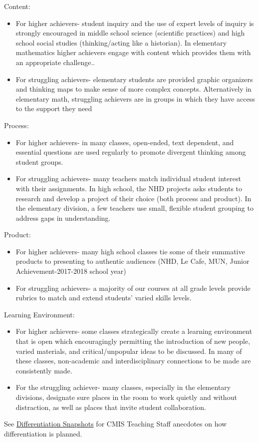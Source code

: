 \begin{findings}
Content:
\begin{itemize}
\item For higher achievers- student inquiry and the use of expert levels of inquiry is strongly encouraged in middle school science (scientific practices) and high school social studies (thinking/acting like a historian). In elementary mathematics higher achievers engage with content which provides them with an appropriate challenge..
\item For struggling achievers- elementary students are provided graphic organizers and thinking maps to make sense of more complex concepts. Alternatively in elementary math, struggling achievers are in groups in which they have access to the support they need
\end{itemize}
Process:
\begin{itemize} 
\item For higher achievers- in many classes, open-ended, text dependent, and essential questions are used regularly to promote divergent thinking among student groups. 
\item For struggling achievers- many teachers match individual student interest with their assignments. In high school, the NHD projects asks students to research and develop a project of their choice (both process and product). In the elementary division, a few teachers use small, flexible student grouping to address gaps in understanding. 
\end{itemize}
Product:
\begin{itemize}
\item For higher achievers- many high school classes tie some of their summative products to presenting to authentic audiences (NHD, Le Cafe, MUN, Junior Achievement-2017-2018 school year) 
\item For struggling achievers- a majority of our courses at all grade levels provide rubrics to match and extend students' varied skills levels.
\end{itemize}
Learning Environment:
\begin{itemize}
\item For higher achievers- some classes strategically create a learning environment that is open which encouragingly permitting the introduction of new people, varied materials, and critical/unpopular ideas to be discussed. In many of these classes, non-academic and interdisciplinary connections to be made are consistently made. 
\item For the struggling achiever- many classes, especially in the elementary divisions, designate sure places in the room to work quietly and without distraction, as well as places that invite student collaboration.
\end{itemize}
See \href{https://docs.google.com/a/cmis.ac.th/document/d/1-1JJSv17D_c977S9eurKz7ciZOyoZOscboWPTEE3hAs/edit?usp=sharing}{Differentiation Snapshots} for CMIS Teaching Staff anecdotes on how differentiation is planned. 


\end{findings}
